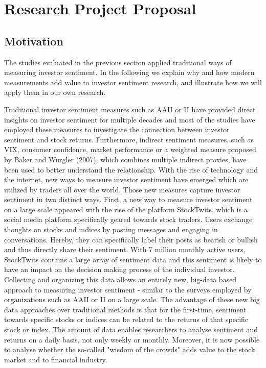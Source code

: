 \section{Research Project Proposal} \label{research-proposal-section}
\subsection{Motivation}
The studies evaluated in the previous section applied traditional ways of measuring investor sentiment. In the following we explain why and how modern measurements add value to investor sentiment research, and illustrate how we will apply them in our own research.
\par
Traditional investor sentiment measures such as AAII or II have provided direct insights on investor sentiment for multiple decades and most of the studies have employed these measures to investigate the connection between investor sentiment and stock returns. Furthermore, indirect sentiment measures, such as VIX, consumer confidence, market performance or a weighted measure proposed by Baker and Wurgler (2007), which combines multiple indirect proxies, have been used to better understand the relationship. With the rise of technology and the internet, new ways to measure investor sentiment have emerged which are utilized by traders all over the world. Those new measures capture investor sentiment in two distinct ways. First, a new way to measure investor sentiment on a large scale appeared with the rise of the platform StockTwits, which is a social media platform specifically geared towards stock traders. Users exchange thoughts on stocks and indices by posting messages and engaging in conversations. Hereby, they can specifically label their posts as bearish or bullish and thus directly share their sentiment. With 7 million monthly active users, StockTwits contains a large array of sentiment data and this sentiment is likely to have an impact on the decision making process of the individual investor. Collecting and organizing this data allows an entirely new, big-data based approach to measuring investor sentiment - similar to the surveys employed by organizations such as AAII or II on a large scale. The advantage of these new big data approaches over traditional methods is that for the first-time, sentiment towards specific stocks or indices can be related to the returns of that specific stock or index. The amount of data enables researchers to analyse sentiment and returns on a daily basis, not only weekly or monthly. Moreover, it is now possible to analyse whether the so-called "wisdom of the crowds" adds value to the stock market and to financial industry.
